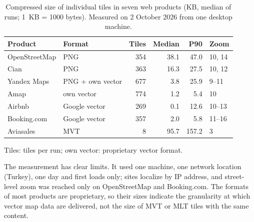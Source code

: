 \begin{table}[!htbp]
\centering
\caption{Compressed size of individual tiles in seven web products (KB, median of runs;
1~KB = 1000 bytes). Measured on 2 October 2026 from one desktop machine.}
\label{tab:traffic}
\footnotesize
\setlength{\tabcolsep}{2.5pt}
\begin{tabular}{@{}l l r r r l@{}}
\toprule
Product & Format & Tiles & Median & P90 & Zoom \\
\midrule
OpenStreetMap & PNG              & 354 & 38.1 & 47.0  & 10, 14 \\
Cian          & PNG              & 363 & 16.3 & 27.5  & 10, 12 \\
Yandex Maps   & PNG + own vector & 677 & 3.8  & 25.9  & 9--11 \\
Amap          & own vector       & 774 & 1.2  & 5.4   & 10 \\
Airbnb        & Google vector    & 269 & 0.1  & 12.6  & 10--13 \\
Booking.com   & Google vector    & 357 & 2.0  & 5.8   & 11--16 \\
Aviasales     & MVT              & 8   & 95.7 & 157.2 & 3 \\
\bottomrule
\end{tabular}

\smallskip
{\scriptsize Tiles: tiles per run; own vector: proprietary vector format.}
\end{table}

The measurement has clear limits. It used one machine, one network location (Turkey),
one day and first loads only; sites localize by IP address, and street-level zoom was
reached only on OpenStreetMap and Booking.com. The formats of most products are
proprietary, so their sizes indicate the granularity at which vector map data are
delivered, not the size of MVT or MLT tiles with the same content.
